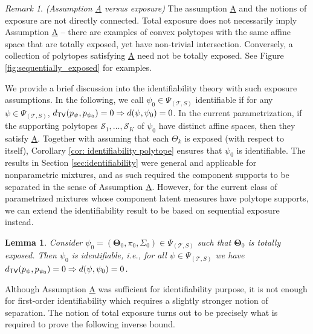 \documentclass[bj,authoryear]{imsart}
\theoremstyle{plain}
\newtheorem{lemma}{Lemma}[section]
\theoremstyle{remark}
\newtheorem{remark}{Remark}
\def\bTheta{{\boldsymbol\Theta}}
\def\cS{\mathcal{S}}
\def\cT{\mathcal{T}}
\def\TV{{\sf TV}}
\def\bTheta{\boldsymbol{\Theta}}
\begin{document}
\begin{remark}  \textit{    (Assumption \hyperref[assume:A]{A} versus exposure)}
    The assumption \hyperref[assume:A]{A} and the notions of exposure are not directly connected. Total exposure does not necessarily imply Assumption \hyperref[assume:A]{A} -- there are examples of convex polytopes with the same affine space that are totally exposed, yet have non-trivial intersection. Conversely, a collection of polytopes satisfying \hyperref[assume:A]{A} need not be totally exposed. See Figure \ref{fig:sequentially_exposed} for examples.
\end{remark}

We provide a brief discussion into the identifiability theory with such exposure assumptions. In the following, we call $\psi_0\in\Psi_{(\cT,S)}$ identifiable if for any $\psi\in\Psi_{(\cT,S)}$, $d_{\TV}(p_{\psi},p_{\psi_0})=0\Rightarrow d(\psi,\psi_0)=0$. In the current parametrization, if the supporting polytopes $\cS_1,\dots,\cS_K$ of $\psi_0$ have distinct affine spaces, then they satisfy \hyperref[assume:A]{A}. Together with assuming that each $\Theta_k$ is exposed (with respect to itself), Corollary \ref{cor: identifiability polytope} ensures that $\psi_0$ is identifiable.  The results in Section \ref{sec:identifiability} were general and applicable for nonparametric mixtures, and as such required the component supports to be separated in the sense of Assumption \hyperref[assume:A]{A}. However, for the current class of parametrized mixtures whose component latent measures have polytope supports, we can extend the identifiability result to be based on sequential exposure instead. 

\begin{lemma}\label{lemma:identifiability_sequentially exposed}
        Consider $\psi_0=(\bTheta_0, \pi_0, \Sigma_0)\in\Psi_{(\cT,S)}$ such that $\bTheta_0$ is totally exposed. Then $\psi_0$ is identifiable, i.e., for all $\psi\in\Psi_{(\cT,S)}$  we have $d_{\TV}(p_{\psi},p_{\psi_0})=0\Rightarrow d(\psi,\psi_0) =0$.
    \end{lemma}

Although Assumption \hyperref[assume:A]{A} was sufficient for identifiability purpose, it is not enough for first-order identifiability which requires a slightly stronger notion of separation. The notion of total exposure turns out to be precisely what is required to prove the following inverse bound.
\end{document}
